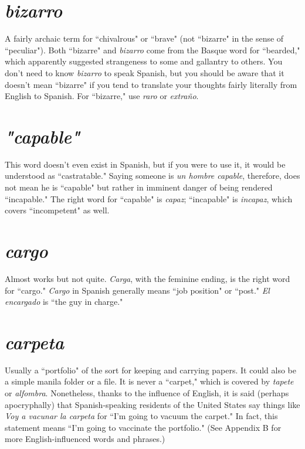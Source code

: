 \section{\emph{bizarro}}

A fairly archaic term for ``chivalrous" or ``brave"
(not ``bizarre" in the sense of ``peculiar"). Both ``bizarre" and \emph{bizarro}
come from the Basque word for ``bearded," which apparently suggested
strangeness to some and gallantry to others. You don't need to know
\emph{bizarro} to speak Spanish, but you should be aware that it doesn't mean
``bizarre" if you tend to translate your thoughts fairly literally from English to Spanish. For ``bizarre," use \emph{raro} or \emph{extraño}.

\section{\emph{"capable"}}

This word doesn't even exist in Spanish, but if
you were to use it, it would be understood as ``castratable." Saying
someone is \emph{un hombre capable}, therefore, does not mean he is ``capable" but rather in imminent danger of being rendered ``incapable."
The right word for ``capable" is \emph{capaz}; ``incapable" is \emph{incapaz}, which
covers ``incompetent" as well.

\section{\emph{cargo}}

Almost works but not quite. \emph{Carga}, with the feminine ending, is the right word for ``cargo." \emph{Cargo} in Spanish generally
means ``job position" or ``post." \emph{El encargado} is ``the guy in charge."

\section{\emph{carpeta}}

Usually a ``portfolio" of the sort for keeping and
carrying papers. It could also be a simple manila folder or a file. It is
never a ``carpet," which is covered by \emph{tapete} or \emph{alfombra}. Nonetheless,
thanks to the influence of English, it is said (perhaps apocryphally) that
Spanish-speaking residents of the United States say things like \emph{Voy a
vacunar la carpeta} for ``I'm going to vacuum the carpet." In fact, this
statement means ``I'm going to vaccinate the portfolio." (See Appendix
B for more English-influenced words and phrases.)

